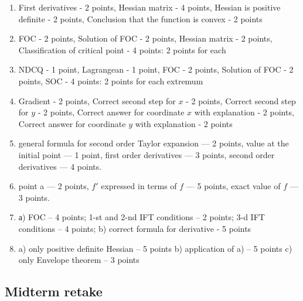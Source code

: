 \begin{enumerate}
  \item First derivatives - 2 points, Hessian matrix - 4 points, Hessian is positive definite - 2 points, Conclusion that the function is convex - 2 points
  \item FOC - 2 points, Solution of FOC - 2 points, Hessian matrix - 2 points, Classification of critical point - 4 points: 2 points for each

  \item NDCQ - 1 point,  Lagrangean - 1 point, FOC - 2 points, Solution of FOC - 2 points, SOC - 4 points: 2 points for each extremum
\item
Gradient - 2 points, Correct second step for $x$ - 2 points, Correct second step for $y$ - 2 points, Correct answer for coordinate $x$ with explanation - 2 points, Correct answer for coordinate $y$ with explanation - 2 points
\item general formula for second order Taylor expansion — 2 points, value at the initial point — 1 point, first order derivatives — 3 points, second order derivatives — 4 points.
\item point a — 2 points, $f'$ expressed in terms of $f$ — 5 points, exact value of $f$ — 3 points.
\item
а) FOC – 4 points; 1-st and 2-nd IFT conditions – 2 points; 3-d IFT conditions – 4 points;
b) correct formula for derivative - 5 points
\item
a) only positive definite Hessian – 5 points
b) application of a) – 5 points
c) only Envelope theorem – 3 points
\end{enumerate}

\subsection{Midterm retake}

